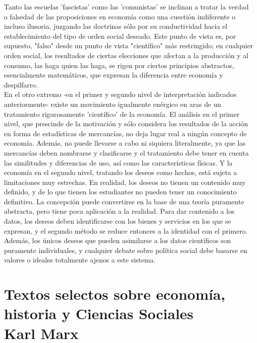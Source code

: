Tanto las escuelas 'fascistas' como las 'comunistas' se inclinan a tratar la verdad o falsedad de las proposiciones en economía como una cuestión indiferente o incluso ilusoria, juzgando las doctrinas sólo por su conductividad hacia el establecimiento del tipo de orden social deseado. Este punto de vista es, por supuesto, "falso" desde un punto de vista "científico" más restringido; en cualquier orden social, los resultados de ciertas elecciones que afectan a la producción y al consumo, las haga quien las haga, se rigen por ciertos principios abstractos, esencialmente matemáticos, que expresan la diferencia entre economía y despilfarro. \\

En el otro extremo -en el primer y segundo nivel de interpretación indicados anteriormente- existe un movimiento igualmente enérgico en aras de un tratamiento rigurosamente 'científico' de la economía. El análisis en el primer nivel, que prescinde de la motivación y sólo considera los resultados de la acción en forma de estadísticas de mercancías, no deja lugar real a ningún concepto de economía. Además, no puede llevarse a cabo ni siquiera literalmente, ya que las mercancías deben nombrarse y clasificarse y el tratamiento debe tener en cuenta las similitudes y diferencias de uso, así como las características físicas. Y la economía en el segundo nivel, tratando los deseos como hechos, está sujeta a limitaciones muy estrechas. En realidad, los deseos no tienen un contenido muy definido, y de lo que tienen los estudiantes no pueden tener un conocimiento definitivo. La concepción puede convertirse en la base de una teoría puramente abstracta, pero tiene poca aplicación a la realidad. Para dar contenido a los datos, los deseos deben identificarse con los bienes y servicios en los que se expresan, y el segundo método se reduce entonces a la identidad con el primero. Además, los únicos deseos que pueden asimilarse a los datos científicos son puramente individuales, y cualquier debate sobre política social debe basarse en valores o ideales totalmente ajenos a este sistema.

\chapter{Textos selectos sobre economía, historia y Ciencias Sociales\\ Karl Marx}


